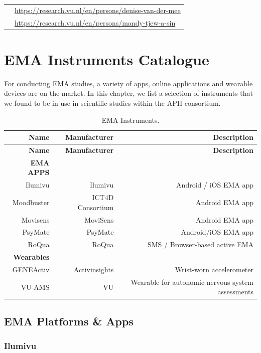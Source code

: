 \documentclass[]{book}
\begin{document}
\begin{longtable}[]{@{}ll@{}}
\begin{minipage}[t]{0.25\columnwidth}
\strut
\end{minipage} & \begin{minipage}[t]{0.69\columnwidth}\raggedright\strut
\url{https://research.vu.nl/en/persons/denise-van-der-mee}\strut
\end{minipage}\tabularnewline
\begin{minipage}[t]{0.25\columnwidth}\raggedright\strut
\strut
\end{minipage} & \begin{minipage}[t]{0.69\columnwidth}\raggedright\strut
\url{https://research.vu.nl/en/persons/mandy-tjew-a-sin}\strut
\end{minipage}\tabularnewline
\bottomrule
\end{longtable}

\chapter{EMA Instruments Catalogue}\label{ema-instruments-catalogue}

For conducting EMA studies, a variety of apps, online applications and
wearable devices are on the market. In this chapter, we list a selection
of instruments that we found to be in use in scientific studies within
the APH consortium.

\begin{longtable}[]{@{}rrr@{}}
\caption{\label{tab:14a} EMA Instruments.}\tabularnewline
\toprule
\textbf{Name} & \textbf{Manufacturer} &
\textbf{Description}\tabularnewline
\midrule
\endfirsthead
\toprule
\textbf{Name} & \textbf{Manufacturer} &
\textbf{Description}\tabularnewline
\midrule
\endhead
\textbf{EMA APPS} & &\tabularnewline
Ilumivu & Ilumivu & Android / iOS EMA app\tabularnewline
Moodbuster & ICT4D Consortium & Android EMA app\tabularnewline
Movisens & MoviSens & Android EMA app\tabularnewline
PsyMate & PsyMate & Android/iOS EMA app\tabularnewline
RoQua & RoQua & SMS / Browser-based active EMA\tabularnewline
\textbf{Wearables} & &\tabularnewline
GENEActiv & Activinsights & Wrist-worn accelerometer\tabularnewline
VU-AMS & VU & Wearable for autonomic nervous system
assessments\tabularnewline
\bottomrule
\end{longtable}

\section{EMA Platforms \& Apps}\label{ema-platforms-apps}

\subsection{Ilumivu}\label{ilumivu}
\end{document}
